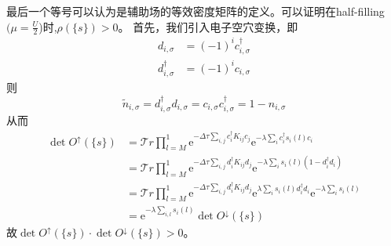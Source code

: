 \documentclass[UTF8,cs4size]{ctexart}
\def\ee{\mathrm e}
\begin{document}
最后一个等号可以认为是辅助场的等效密度矩阵的定义。可以证明在half-filling$(\mu=\frac{U}{2}$)时,$\rho (\{s\})>0$。
首先，我们引入电子空穴变换，即
\[
    \begin{aligned}
        d_{i,\sigma} &= (-1)^{i} c^{\dag}_{i,\sigma}\\
        d^{\dag}_{i,\sigma} &= (-1)^{i} c_{i,\sigma}
    \end{aligned}   
\]
则 
\[
    \tilde{n}_{i,\sigma} =  d^{\dag}_{i,\sigma} d_{i,\sigma} =   c_{i,\sigma} c^{\dag}_{i,\sigma}
    =1- n_{i,\sigma}
\]
从而
\[
    \begin{aligned}
        \det O^{\uparrow}(\{s\}) &= \mathcal{T}r \prod_{l=M}^{1} 
        \ee^{-\Delta \tau \sum_{i,j} c^{\dag}_{i} K_{ij} c_{j}}
        \ee^{- \lambda \sum_{i} c^{\dag}_{i} s_{i}(l) c_{i}}\\
        &=\mathcal{T}r \prod_{l=M}^{1} 
        \ee^{-\Delta \tau \sum_{i,j} d^{\dag}_{i} K_{ij} d_{j}}
        \ee^{- \lambda \sum_{i} s_{i}(l) (1-d^{\dag}_{i}d_{i})}\\
        &=\mathcal{T}r \prod_{l=M}^{1} 
        \ee^{-\Delta \tau \sum_{i,j} d^{\dag}_{i} K_{ij} d_{j}}
        \ee^{ \lambda \sum_{i} s_{i}(l) d^{\dag}_{i}d_{i}} \ee^{-\lambda \sum_{i} s_{i}(l)}\\
        &= \ee^{-\lambda \sum_{i,l} s_{i}(l)} \det O^{\downarrow} (\{s\})
    \end{aligned}    
\]
故$\det O^{\uparrow}(\{s\}) \cdot \det O^{\downarrow} (\{s\}) > 0$。
\end{document}
